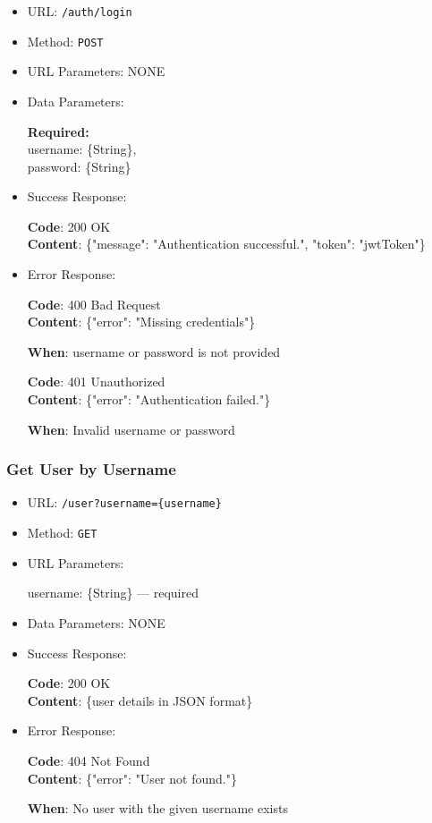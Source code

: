 \begin{itemize}
    \item URL: \texttt{/auth/login}
    \item Method: \texttt{POST}
    \item URL Parameters: NONE
    \item Data Parameters:

    \textbf{Required:} \\
    username: \{String\}, \\
    password: \{String\}

    \item Success Response: \newline

    \textbf{Code}: 200 OK \\
    \textbf{Content}: \{"message": "Authentication successful.", "token": "jwtToken"\}

    \item Error Response: \newline

    \textbf{Code}: 400 Bad Request \\
    \textbf{Content}: \{"error": "Missing credentials"\}

    \textbf{When}: username or password is not provided \newline

    \textbf{Code}: 401 Unauthorized \\
    \textbf{Content}: \{"error": "Authentication failed."\}

    \textbf{When}: Invalid username or password
\end{itemize}

\subsubsection*{Get User by Username}

\begin{itemize}
    \item URL: \texttt{/user?username=\{username\}}
    \item Method: \texttt{GET}
    \item URL Parameters:

    username: \{String\} — required

    \item Data Parameters: NONE

    \item Success Response: \newline

    \textbf{Code}: 200 OK \\
    \textbf{Content}: \{user details in JSON format\}

    \item Error Response: \newline

    \textbf{Code}: 404 Not Found \\
    \textbf{Content}: \{"error": "User not found."\}

    \textbf{When}: No user with the given username exists
\end{itemize}

